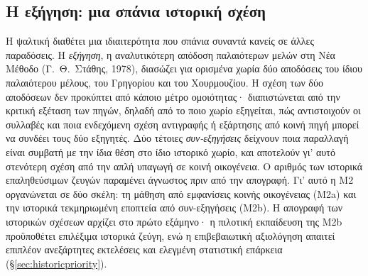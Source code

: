 \documentclass[a4paper]{article}
\begin{document}
\subsection{Η εξήγηση: μια σπάνια ιστορική σχέση}\label{sec:exegesis}
Η ψαλτική διαθέτει μια ιδιαιτερότητα που σπάνια συναντά κανείς σε άλλες παραδόσεις. Η \emph{εξήγηση}, η αναλυτικότερη απόδοση παλαιότερων μελών στη Νέα Μέθοδο (Γ.~Θ.~Στάθης, 1978), διασώζει για ορισμένα χωρία δύο αποδόσεις του ίδιου παλαιότερου μέλους, του Γρηγορίου και του Χουρμουζίου. Η σχέση των δύο αποδόσεων δεν προκύπτει από κάποιο μέτρο ομοιότητας· διαπιστώνεται από την κριτική εξέταση των πηγών, δηλαδή από το ποιο χωρίο εξηγείται, πώς αντιστοιχούν οι συλλαβές και ποια ενδεχόμενη σχέση αντιγραφής ή εξάρτησης από κοινή πηγή μπορεί να συνδέει τους δύο εξηγητές. Δύο τέτοιες \emph{συν-εξηγήσεις} δείχνουν ποια παραλλαγή είναι συμβατή με την ίδια θέση στο ίδιο ιστορικό χωρίο, και αποτελούν γι' αυτό στενότερη σχέση από την απλή υπαγωγή σε κοινή οικογένεια. Ο αριθμός των ιστορικά επαληθεύσιμων ζευγών παραμένει άγνωστος πριν από την απογραφή. Γι’ αυτό η Μ2 οργανώνεται σε δύο σκέλη: τη μάθηση από εμφανίσεις κοινής οικογένειας (Μ2a) και την ιστορικά τεκμηριωμένη εποπτεία από συν-εξηγήσεις (Μ2b). Η απογραφή των ιστορικών σχέσεων αρχίζει στο πρώτο εξάμηνο· η πιλοτική εκπαίδευση της Μ2b προϋποθέτει επιλέξιμα ιστορικά ζεύγη, ενώ η επιβεβαιωτική αξιολόγηση απαιτεί επιπλέον ανεξάρτητες εκτελέσεις και ελεγμένη στατιστική επάρκεια (§\ref{sec:historicpriority}).
\end{document}
